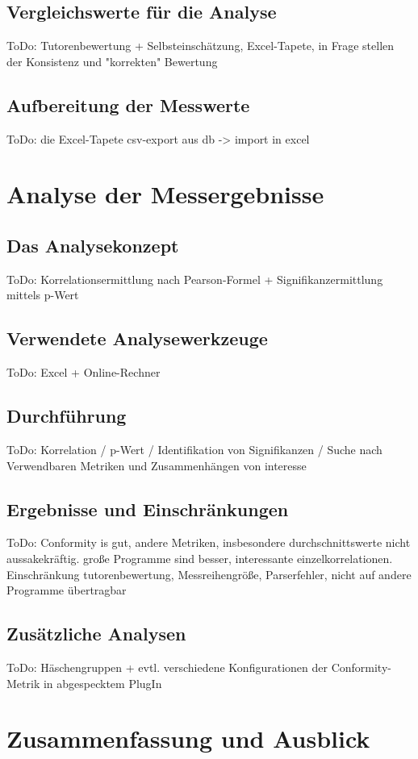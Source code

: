 \documentclass[da,ngerman]{stthesis}
\begin{document}
  		\section{Vergleichswerte für die Analyse}
  			ToDo: Tutorenbewertung + Selbsteinschätzung, Excel-Tapete, in Frage stellen der Konsistenz und "korrekten" Bewertung
  		\section{Aufbereitung der Messwerte}
  			ToDo: die Excel-Tapete csv-export aus db -> import in excel
  		
  	\chapter{Analyse der Messergebnisse}
  		\section{Das Analysekonzept}
  			ToDo: Korrelationsermittlung nach Pearson-Formel + Signifikanzermittlung mittels p-Wert
  		\section{Verwendete Analysewerkzeuge}
  			ToDo: Excel + Online-Rechner
  		\section{Durchführung}
  			ToDo: Korrelation / p-Wert / Identifikation von Signifikanzen / Suche nach Verwendbaren Metriken und Zusammenhängen von interesse
  		\section{Ergebnisse und Einschränkungen}
  			ToDo: Conformity is gut, andere Metriken, insbesondere durchschnittswerte nicht aussakekräftig. große Programme sind besser, interessante einzelkorrelationen. Einschränkung tutorenbewertung, Messreihengröße, Parserfehler, nicht auf andere Programme übertragbar 
  		\section{Zusätzliche Analysen}
  			ToDo: Häschengruppen + evtl. verschiedene Konfigurationen der Conformity-Metrik in abgespecktem PlugIn
  		
  	\chapter{Zusammenfassung und Ausblick}	
\end{document}
